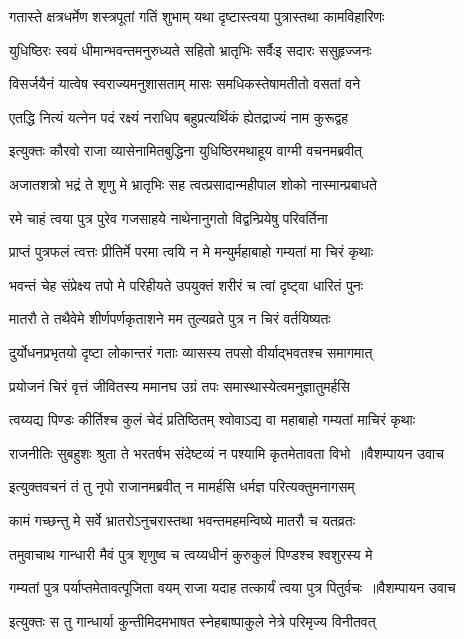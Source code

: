 \twolineshloka
{गतास्ते क्षत्रधर्मेण शस्त्रपूतां गतिं शुभाम्}
{यथा दृष्टास्त्वया पुत्रास्तथा कामविहारिणः}


\twolineshloka
{युधिष्ठिरः स्वयं धीमान्भवन्तमनुरुध्यते}
{सहितो भ्रातृभिः सर्वैःइ सदारः ससुहृज्जनः}


\twolineshloka
{विसर्जयैनं यात्वेष स्वराज्यमनुशासताम्}
{मासः समधिकस्तेषामतीतो वसतां वने}


\twolineshloka
{एतद्धि नित्यं यत्नेन पदं रक्ष्यं नराधिप}
{बहुप्रत्यर्थिकं ह्येतद्राज्यं नाम कुरूद्वह}


\twolineshloka
{इत्युक्तः कौरवो राजा व्यासेनामितबुद्धिना}
{युधिष्ठिरमथाहूय वाग्मी वचनमब्रवीत्}


\twolineshloka
{अजातशत्रो भद्रं ते शृणु मे भ्रातृभिः सह}
{त्वत्प्रसादान्महीपाल शोको नास्मान्प्रबाधते}


\twolineshloka
{रमे चाहं त्वया पुत्र पुरेव गजसाहये}
{नाथेनानुगतो विद्वन्प्रियेषु परिवर्तिना}


\twolineshloka
{प्राप्तं पुत्रफलं त्वत्तः प्रीतिर्मे परमा त्वयि}
{न मे मन्युर्महाबाहो गम्यतां मा चिरं कृथाः}


\twolineshloka
{भवन्तं चेह संप्रेक्ष्य तपो मे परिहीयते}
{उपयुक्तं शरीरं च त्वां दृष्ट्वा धारितं पुनः}


\twolineshloka
{मातरौ ते तथैवेमे शीर्णपर्णकृताशने}
{मम तुल्यव्रते पुत्र न चिरं वर्तयिष्यतः}


\twolineshloka
{दुर्योधनप्रभृतयो दृष्टा लोकान्तरं गताः}
{व्यासस्य तपसो वीर्याद्भवतश्च समागमात्}


\twolineshloka
{प्रयोजनं चिरं वृत्तं जीवितस्य ममानघ}
{उग्रं तपः समास्थास्येत्वमनुज्ञातुमर्हसि}


\twolineshloka
{त्वय्यद्य पिण्डः कीर्तिश्च कुलं चेदं प्रतिष्ठितम्}
{श्वोवाऽद्य वा महाबाहो गम्यतां माचिरं कृथाः}


\threelineshloka
{राजनीतिः सुबहुशः श्रुता ते भरतर्षभ}
{संदेष्टव्यं न पश्यामि कृतमेतावता विभो ॥वैशम्पायन उवाच}
{}


\twolineshloka
{इत्युक्तवचनं तं तु नृपो राजानमब्रवीत्}
{न मामर्हसि धर्मज्ञ परित्यक्तुमनागसम्}


\twolineshloka
{कामं गच्छन्तु मे सर्वे भ्रातरोऽनुचरास्तथा}
{भवन्तमहमन्विष्ये मातरौ च यतव्रतः}


\twolineshloka
{तमुवाचाथ गान्धारी मैवं पुत्र शृणुष्व च}
{त्वय्यधीनं कुरुकुलं पिण्डश्च श्वशुरस्य मे}


\threelineshloka
{गम्यतां पुत्र पर्याप्तमेतावत्पूजिता वयम्}
{राजा यदाह तत्कार्यं त्वया पुत्र पितुर्वचः ॥वैशम्पायन उवाच}
{}


\twolineshloka
{इत्युक्तः स तु गान्धार्या कुन्तीमिदमभाषत}
{स्नेहबाष्पाकुले नेत्रे परिमृज्य विनीतवत्}


